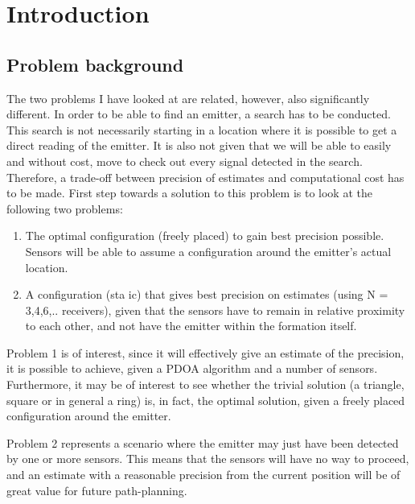 \documentclass[10pt,a4paper]{book}
\begin{document}
\section{Introduction}

\subsection{Problem background}

The two problems I have looked at are related, however, also significantly different. In order to be able to find an emitter, a search has to be conducted. This search is not necessarily starting in a location where it is possible to get a direct reading of the emitter. It is also not given that we will be able to easily and without cost, move to check out every signal detected in the search. Therefore, a trade-off between precision of estimates and computational cost has to be made. First step towards a solution to this problem is to look at the following two problems:

\begin{enumerate}
\item The optimal configuration (freely placed) to gain best precision possible. Sensors will be able to assume a configuration around the emitter's actual location.
\item A configuration (sta ic) that gives best precision on estimates (using N = 3,4,6,.. receivers), given that the sensors have to remain in relative proximity to each other, and not have the emitter within the formation itself.
\end{enumerate}

Problem 1 is of interest, since it will effectively give an estimate of the precision, it is possible to achieve, given a \gls{PDOA} algorithm and a number of sensors. Furthermore, it may be of interest to see whether the trivial solution (a triangle, square or in general a ring) is, in fact, the optimal solution, given a freely placed configuration around the emitter.

Problem 2 represents a scenario where the emitter may just have been detected by one or more sensors. This means that the sensors will have no way to proceed, and an estimate with a reasonable precision from the current position will be of great value for future path-planning.
\end{document}
